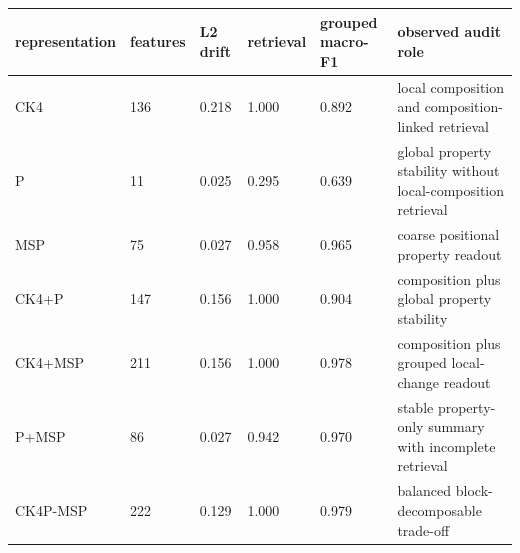 \begin{tabular}{@{}p{}p{}p{}p{}p{}p{}@{}}
\toprule
\textbf{representation} & \textbf{features} & \textbf{L2 drift} & \textbf{retrieval} & \textbf{grouped macro-F1} & \textbf{observed audit role} \\
\midrule
CK4 & 136 & 0.218 & 1.000 & 0.892 & local composition and composition-linked retrieval \\
P & 11 & 0.025 & 0.295 & 0.639 & global property stability without local-composition retrieval \\
MSP & 75 & 0.027 & 0.958 & 0.965 & coarse positional property readout \\
CK4+P & 147 & 0.156 & 1.000 & 0.904 & composition plus global property stability \\
CK4+MSP & 211 & 0.156 & 1.000 & 0.978 & composition plus grouped local-change readout \\
P+MSP & 86 & 0.027 & 0.942 & 0.970 & stable property-only summary with incomplete retrieval \\
CK4P-MSP & 222 & 0.129 & 1.000 & 0.979 & balanced block-decomposable trade-off \\
\bottomrule
\end{tabular}
